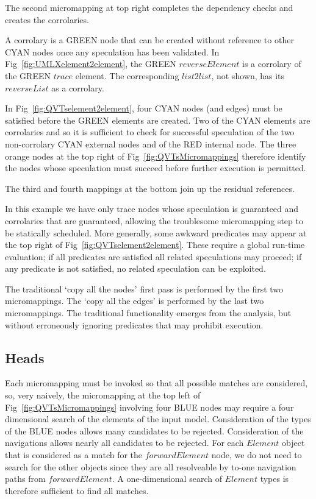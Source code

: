 \documentclass{llncs}
\begin{document}
The second micromapping at top right completes the dependency checks and creates the corrolaries.

A corrolary is a GREEN node that can be created without reference to other CYAN nodes once any speculation has been validated. In Fig~\ref{fig:UMLXelement2element}, the GREEN $reverseElement$ is a corrolary of the GREEN $trace$ element. The corresponding $list2list$, not shown, has its $reverseList$ as a corrolary.

In Fig~\ref{fig:QVTselement2element}, four CYAN nodes (and edges) must be satisfied before the GREEN elements are created. Two of the CYAN elements are corrolaries and so it is sufficient to check for successful speculation of the two non-corrolary CYAN external nodes and of the RED internal node. The three orange nodes at the top right of Fig~\ref{fig:QVTsMicromappings} therefore identify the nodes whose speculation must succeed before further execution is permitted.

The third and fourth mappings at the bottom join up the residual references.

In this example we have only trace nodes whose speculation is guaranteed and corrolaries that are guaranteed, allowing the troublesome micromapping step to be statically scheduled. More generally, some awkward predicates may appear at the top right of Fig~\ref{fig:QVTselement2element}. These require a global run-time evaluation; if all predicates are satisfied all related speculations may proceed; if any predicate is not satisfied, no related speculation can be exploited.

The traditional `copy all the nodes' first pass is performed by the first two micromappings. The `copy all the edges' is performed by the last two micromappings. The traditional functionality emerges from the analysis, but without erroneously ignoring predicates that may prohibit execution.   

\subsection{Heads}\label{Heads}

Each micromapping must be invoked so that all possible matches are considered, so, very naively, the micromapping at the top left of Fig~\ref{fig:QVTsMicromappings} involving four BLUE nodes may require a four dimensional search of the elements of the input model. Consideration of the types of the BLUE nodes allows many candidates to be rejected. Consideration of the navigations allows nearly all candidates to be rejected. For each $Element$ object that is considered as a match for the $forwardElement$ node, we do not need to search for the other objects since they are all resolveable by to-one navigation paths from $forwardElement$. A one-dimensional search of $Element$ types is therefore sufficient to find all matches.
\end{document}
